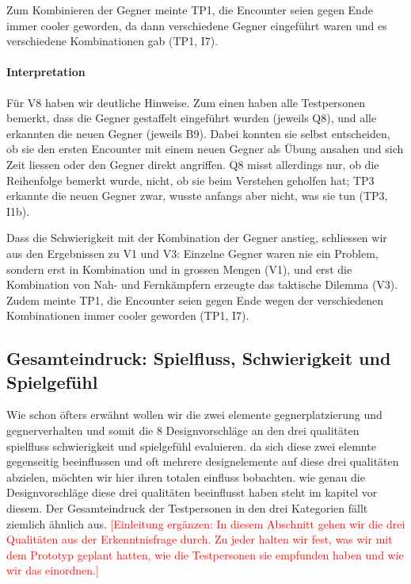 \documentclass[../Main.tex]{subfiles}
\begin{document}
Zum Kombinieren der Gegner meinte TP1, die Encounter seien gegen Ende immer cooler geworden, da dann verschiedene Gegner eingeführt waren und es verschiedene Kombinationen gab (TP1, I7).

\paragraph{Interpretation}
Für V8 haben wir deutliche Hinweise. Zum einen haben alle Testpersonen bemerkt, dass die Gegner gestaffelt eingeführt wurden (jeweils Q8), und alle erkannten die neuen Gegner (jeweils B9). Dabei konnten sie selbst entscheiden, ob sie den ersten Encounter mit einem neuen Gegner als Übung ansahen und sich Zeit liessen oder den Gegner direkt angriffen. Q8 misst allerdings nur, ob die Reihenfolge bemerkt wurde, nicht, ob sie beim Verstehen geholfen hat; TP3 erkannte die neuen Gegner zwar, wusste anfangs aber nicht, was sie tun (TP3, I1b).

Dass die Schwierigkeit mit der Kombination der Gegner anstieg, schliessen wir aus den Ergebnissen zu V1 und V3: Einzelne Gegner waren nie ein Problem, sondern erst in Kombination und in grossen Mengen (V1), und erst die Kombination von Nah- und Fernkämpfern erzeugte das taktische Dilemma (V3). Zudem meinte TP1, die Encounter seien gegen Ende wegen der verschiedenen Kombinationen immer cooler geworden (TP1, I7).

\subsection{Gesamteindruck: Spielfluss, Schwierigkeit und Spielgefühl} \label{sec:Gesamteindruck} \label{sec:ErgAllgemein}

Wie schon öfters erwähnt wollen wir die zwei elemente gegnerplatzierung und gegnerverhalten und somit die 8 Designvorschläge an den drei qualitäten spielfluss schwierigkeit und spielgefühl evaluieren. da sich diese zwei elemnte gegenseitig beeinflussen und oft mehrere designelemente auf diese drei qualitäten abzielen, möchten wir hier ihren totalen einfluss bobachten. wie genau die Designvorschläge diese drei qualitäten beeinflusst haben steht im kapitel vor diesem.
Der Gesamteindruck der Testpersonen in den drei Kategorien fällt ziemlich ähnlich aus. \textcolor{red}{[Einleitung ergänzen: In diesem Abschnitt gehen wir die drei Qualitäten aus der Erkenntnisfrage durch. Zu jeder halten wir fest, was wir mit dem Prototyp geplant hatten, wie die Testpersonen sie empfunden haben und wie wir das einordnen.]}
\end{document}
